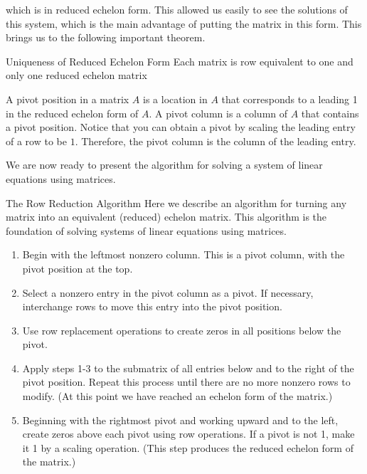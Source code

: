 which is in reduced echelon form. This allowed us easily to see the solutions of this system, which is the main advantage of putting the matrix in this form. This brings us to the following important theorem.

\begin{theorem}{Uniqueness of Reduced Echelon Form}
    Each matrix is row equivalent to one and only one reduced echelon matrix
\end{theorem}

A pivot position in a matrix $A$ is a location in $A$ that corresponds to a leading 1 in the reduced echelon form of $A$. A pivot column is a column of $A$ that contains a pivot position. Notice that you can obtain a pivot by scaling the leading entry of a row to be $1$. Therefore, the pivot column is the column of the leading entry.

We are now ready to present the algorithm for solving a system of linear equations using matrices.

\begin{custombox}{The Row Reduction Algorithm}
    Here we describe an algorithm for turning any matrix into an equivalent
    (reduced) echelon matrix. This algorithm is the foundation of solving systems of linear equations using matrices.

    \begin{enumerate}
        \item Begin with the leftmost nonzero column. This is a pivot column, with the pivot position at the top.
        \item Select a nonzero entry in the pivot column as a pivot. If necessary, interchange rows to move this entry into the pivot position.
        \item Use row replacement operations to create zeros in all positions below the pivot.
        \item Apply steps 1-3 to the submatrix of all entries below and to the right of the pivot position. Repeat this process until there are no more nonzero rows to modify. (At this point we have reached an echelon form of the matrix.)
        \item Beginning with the rightmost pivot and working upward and to the left, create zeros above each pivot using row operations. If a pivot is not 1, make it 1 by a scaling operation. (This step produces the reduced echelon form of the matrix.)
    \end{enumerate}

\end{custombox}

